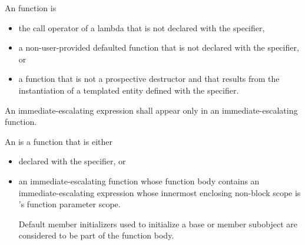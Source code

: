 \pnum
{}%
An  function is
\begin{itemize}
\item
the call operator of a lambda that is not declared
with the  specifier,
\item
a non-user-provided defaulted function
that is not declared with the  specifier, or
\item
a function that is not a prospective destructor and
that results from the instantiation
of a templated entity defined with the  specifier.
\end{itemize}
An immediate-escalating expression shall appear only
in an immediate-escalating function.

\pnum
An  is a function that is either
\begin{itemize}
\item
declared with the  specifier, or
\item
an immediate-escalating function 
whose function body contains an immediate-escalating expression
whose innermost enclosing non-block scope
is 's function parameter scope.
\begin{tailnote}
Default member initializers used to initialize
a base or member subobject
are considered to be part of the function body.
\end{tailnote}
\end{itemize}

